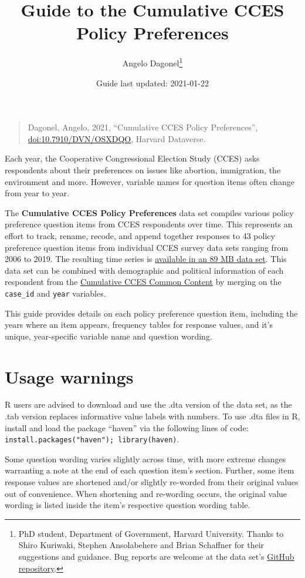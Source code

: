 \documentclass[12pt]{article}
\title{Guide to the Cumulative CCES Policy Preferences}
\author{Angelo Dagonel\footnote{PhD student, Department of Government, Harvard
  University. Thanks to Shiro Kuriwaki, Stephen Ansolabehere and Brian
  Schaffner for their suggestions and guidance. Bug reports are welcome
  at the data set's
  \href{https://github.com/psjello/cumulative_cces_policy_preferences}{GitHub
  repository}.}}
\date{Guide last updated: 2021-01-22}
\begin{document}
\maketitle

\begin{quote}
Dagonel, Angelo, 2021, ``Cumulative CCES Policy Preferences'',
\href{https://dataverse.harvard.edu/dataset.xhtml?persistentId=doi:10.7910/DVN/OSXDQO}{\url{doi:10.7910/DVN/OSXDQO}},
Harvard Dataverse.
\end{quote}

Each year, the Cooperative Congressional Election Study (CCES) asks
respondents about their preferences on issues like abortion,
immigration, the environment and more. However, variable names for
question items often change from year to year.

\medskip
The \textbf{Cumulative CCES Policy Preferences} data set compiles
various policy preference question items from CCES respondents over
time. This represents an effort to track, rename, recode, and append
together responses to 43 policy preference question items from
individual CCES survey data sets ranging from 2006 to 2019. The
resulting time series is
\href{https://dataverse.harvard.edu/dataset.xhtml?persistentId=doi:10.7910/DVN/OSXDQO}{available
in an 89 MB data set}. This data set can be combined with demographic
and political information of each respondent from the
\href{https://dataverse.harvard.edu/dataset.xhtml?persistentId=doi:10.7910/DVN/II2DB6}{Cumulative
CCES Common Content} by merging on the \texttt{case\_id} and
\texttt{year} variables.

\medskip
This guide provides details on each policy preference question item,
including the years where an item appears, frequency tables for response
values, and it's unique, year-specific variable name and question
wording.

\section{Usage warnings}\label{usage-warnings}

R users are advised to download and use the .dta version of the data
set, as the .tab version replaces informative value labels with numbers.
To use .dta files in R, install and load the package ``haven'' via the
following lines of code:
\texttt{install.packages("haven");\ library(haven)}.

\medskip
Some question wording varies slightly across time, with more extreme
changes warranting a note at the end of each question item's section.
Further, some item response values are shortened and/or slightly
re-worded from their original values out of convenience. When shortening
and re-wording occurs, the original value wording is listed inside the
item's respective question wording table.
\end{document}
